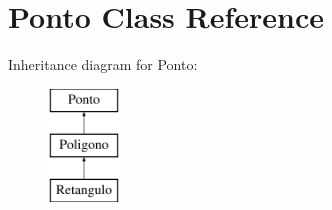 \hypertarget{class_ponto}{}\section{Ponto Class Reference}
\label{class_ponto}
Inheritance diagram for Ponto\+:\begin{figure}[H]
\begin{center}
\leavevmode
\includegraphics[height=3.000000cm]{class_ponto}
\end{center}
\end{figure}
